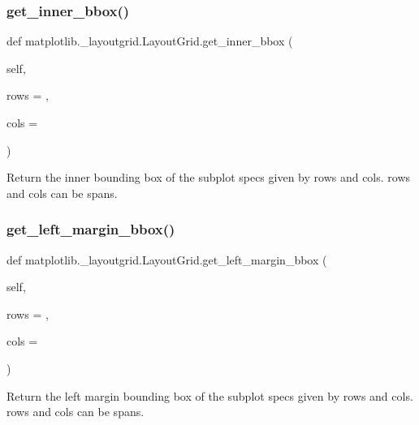 \subsubsection{\texorpdfstring{get\+\_\+inner\+\_\+bbox()}{get\_inner\_bbox()}}
{\footnotesize\ttfamily def matplotlib.\+\_\+layoutgrid.\+Layout\+Grid.\+get\+\_\+inner\+\_\+bbox (\begin{DoxyParamCaption}\item[{}]{self,  }\item[{}]{rows = {},  }\item[{}]{cols = {} }\end{DoxyParamCaption})}

\begin{DoxyVerb}Return the inner bounding box of the subplot specs
given by rows and cols.  rows and cols can be spans.
\end{DoxyVerb}
 \mbox{\label{classmatplotlib_1_1__layoutgrid_1_1LayoutGrid_ae72d1ddfb03a8edd1531aff098928c59}} 
\subsubsection{\texorpdfstring{get\+\_\+left\+\_\+margin\+\_\+bbox()}{get\_left\_margin\_bbox()}}
{\footnotesize\ttfamily def matplotlib.\+\_\+layoutgrid.\+Layout\+Grid.\+get\+\_\+left\+\_\+margin\+\_\+bbox (\begin{DoxyParamCaption}\item[{}]{self,  }\item[{}]{rows = {},  }\item[{}]{cols = {} }\end{DoxyParamCaption})}

\begin{DoxyVerb}Return the left margin bounding box of the subplot specs
given by rows and cols.  rows and cols can be spans.
\end{DoxyVerb}
 \mbox{\label{classmatplotlib_1_1__layoutgrid_1_1LayoutGrid_aab8f13dc350e0f438c5e723dd2dca931}} 
